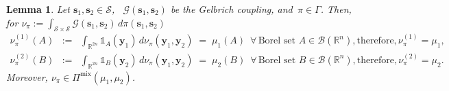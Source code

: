 \documentclass[opre,sglanonrev]{informs4}
\newtheorem{lemma}{Lemma}
\newcommand{\mS}{\mathcal{S}}
\newcommand{\mG}{\mathcal{G}}
\newcommand{\mB}{\mathcal{B}}
\newcommand{\mbR}{\mathbb R}
\newcommand{\ind}{\mathds{1}}
\newcommand{\bs}{\bm{s}}
\newcommand{\by}{\bm{y}}
\begin{document}
\begin{lemma}\label{lem: forward}
 Let $\bs_1, \bs_2 \in \mS$, \ $\mG(\bs_1, \bs_2)$ be the Gelbrich coupling, and $\,\pi \in \Gamma$. Then, for $\nu_{\pi}:=\int_{\mS\times \mS}\mG(\bs_1, \bs_2)\,d\pi(\bs_1,\bs_2)$
\begin{eqnarray}
\nu_{\pi}^{(1)}(A) 
&:=& \int_{\mbR^{2n}} \!\! \ind_{A}(\by_1)\, d\nu_{\pi}(\by_1,\by_2)
\;=\; \mu_1(A) \,\,\, \forall\, \text{Borel set } A\in \mB{(\mbR^n)},
\text{therefore}, \nu_{\pi}^{(1)} = \mu_1,
\label{eq:nu1-equality} \\[0.5em]
\nu_{\pi}^{(2)}(B) 
&:=& \int_{\mbR^{2n}} \!\! \ind_{B}(\by_2)\, d\nu_{\pi}(\by_1,\by_2)
\;=\; \mu_2(B) \,\,\,  \forall\, \text{Borel set } B\in \mB{(\mbR^n)},
\text{therefore}, 
\nu_{\pi}^{(2)} = \mu_2.
\label{eq:nu2-equality}
\end{eqnarray}
Moreover, $\nu_\pi \in \Pi^\mathrm{mix}(\mu_1, \mu_2)$.
\end{lemma}
\vspace{-2em}
\end{document}
